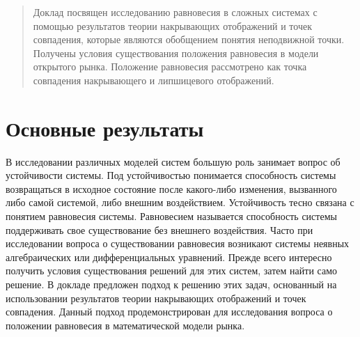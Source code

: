 
\maketitle

\begin{abstract}
Доклад посвящен исследованию равновесия в сложных системах с помощью результатов теории накрывающих отображений и точек совпадения, которые являются обобщением понятия неподвижной точки. Получены условия существования положения равновесия в модели открытого рынка. Положение равновесия рассмотрено как точка совпадения накрывающего и липшицевого отображений.

\end{abstract}

\section{Основные результаты} %

В исследовании различных моделей систем большую роль занимает вопрос об устойчивости системы. Под устойчивостью понимается способность системы возвращаться в исходное состояние после какого-либо изменения, вызванного либо самой системой, либо внешним воздействием. Устойчивость тесно связана с понятием равновесия системы. Равновесием называется способность системы поддерживать свое существование без внешнего воздействия. Часто при исследовании вопроса о существовании равновесия возникают системы неявных алгебраических или дифференциальных уравнений. Прежде всего интересно получить условия существования решений для этих систем, затем найти само решение. В докладе предложен подход к решению этих задач, основанный на использовании результатов теории накрывающих отображений и точек совпадения. Данный подход продемонстрирован для исследования вопроса о положении равновесия в математической модели рынка.

